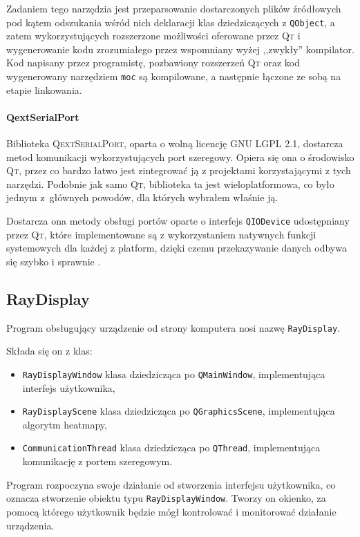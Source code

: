 Zadaniem tego narzędzia jest przeparsowanie dostarczonych plików źródłowych pod kątem odszukania wśród nich deklaracji klas dziedziczących z \verb|QObject|, a zatem wykorzystujących rozszerzone możliwości oferowane przez \textsc{Qt} i wygenerowanie kodu zrozumiałego przez wspomniany wyżej ,,zwykły'' kompilator.
Kod napisany przez programistę, pozbawiony rozszerzeń \textsc{Qt} oraz kod wygenerowany narzędziem \texttt{moc} są kompilowane, a następnie łączone ze sobą na etapie linkowania.

\paragraph{QextSerialPort}
Biblioteka \textsc{QextSerialPort}, oparta o wolną licencję \textsc{GNU LGPL 2.1}, dostarcza metod komunikacji wykorzystujących port szeregowy.
Opiera się ona o środowisko \textsc{Qt}, przez co bardzo łatwo jest zintegrować ją z projektami korzystającymi z tych narzędzi.
Podobnie jak samo \textsc{Qt}, biblioteka ta jest wieloplatformowa, co było jednym z~głównych powodów, dla których wybrałem właśnie ją.

Dostarcza ona metody obsługi portów oparte o interfejs \verb|QIODevice| udostępniany przez \textsc{Qt}, które implementowane są z wykorzystaniem natywnych funkcji systemowych dla każdej z platform, dzięki czemu przekazywanie danych odbywa się szybko i sprawnie \citep{QSP}.

\subsection{RayDisplay}\label{sec:raydisplay}

Program obsługujący urządzenie od strony komputera nosi nazwę \texttt{RayDisplay}.

Składa się on z klas:
\begin{itemize}
 \item \verb|RayDisplayWindow| \pauza klasa dziedzicząca po \verb|QMainWindow|, implementująca interfejs użytkownika,
 \item \verb|RayDisplayScene| \pauza klasa dziedzicząca po \verb|QGraphicsScene|, implementująca algorytm heatmapy,
 \item \verb|CommunicationThread| \pauza klasa dziedzicząca po \verb|QThread|, implementująca komunikację z portem szeregowym.\\
\end{itemize}

Program rozpoczyna swoje działanie od stworzenia interfejsu użytkownika, co oznacza stworzenie obiektu typu \verb|RayDisplayWindow|.
Tworzy on okienko, za pomocą którego użytkownik będzie mógł kontrolować i monitorować działanie urządzenia.

